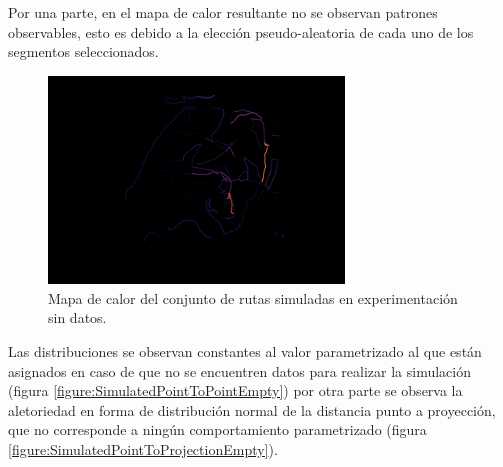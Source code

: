 Por una parte, en el mapa de calor resultante no se observan patrones observables, esto es debido a 
la elección pseudo-aleatoria de cada uno de los segmentos seleccionados.
\begin{figure}[!htb]
\begin{center}
\includegraphics[width=0.7\textwidth]{./Imagenes/HeatMapEmpty.png}
\caption{Mapa de calor del conjunto de rutas simuladas en experimentación sin datos.}
\label{figure:SimulatedHeatMapEmpty}
\end{center}
\end{figure}
\newpage
Las distribuciones se observan constantes al valor parametrizado al que están asignados en caso 
de que no se encuentren datos para realizar la simulación (figura \ref{figure:SimulatedPointToPointEmpty}) por 
otra parte se observa la aletoriedad en forma de distribución normal de la distancia punto a proyección, que no 
corresponde a ningún comportamiento parametrizado (figura \ref{figure:SimulatedPointToProjectionEmpty}).
